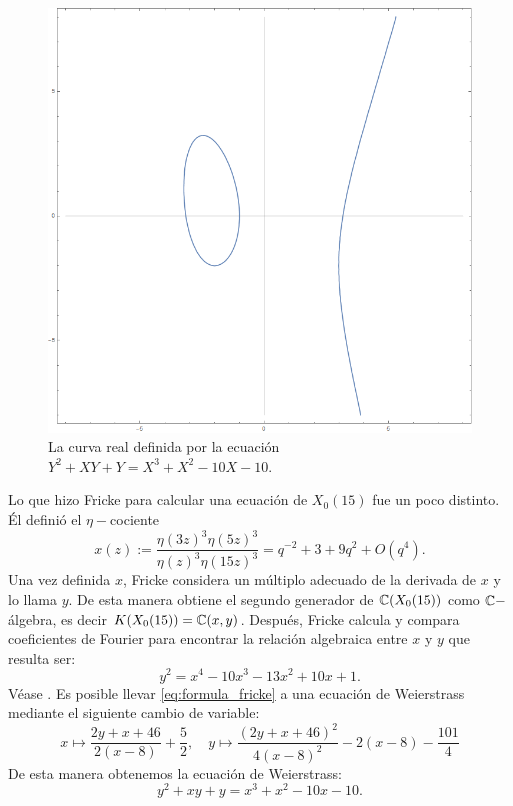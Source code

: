 \begin{figure}[!h]%
  \centering
  \includegraphics[scale=0.3]{figuras/eq_weierstrass}
  \caption{La curva real definida por la ecuación $Y^2+XY+Y=X^3+X^2-10X-10$.}
  \label{fig:eq_weierstrass}
\end{figure}%

\begin{nota}
Lo que hizo Fricke para calcular una ecuación de $X_0(15)$ fue un poco distinto. Él definió el $\eta-$cociente
\begin{equation}\label{eq:def_x_fricke}
	x(z):=
	\frac{\eta(3z)^3\eta(5z)^3}{\eta(z)^3\eta(15z)^3}=
	q^{-2}+3+9q^2+O(q^4).
\end{equation}
Una vez definida $x$, Fricke considera un múltiplo adecuado de la derivada de $x$ y lo llama $y$. De esta manera obtiene el segundo generador de $\mathbb{C}(X_0(15))$ como $\mathbb{C}-$álgebra, es decir $K(X_0(15))=\mathbb{C}(x,y)$. Después, Fricke calcula y compara coeficientes de Fourier para encontrar la relación algebraica entre $x$ y $y$ que resulta ser:
\begin{equation}\label{eq:formula_fricke}
		y^2=x^4-10x^3-13x^2+10x+1.
\end{equation}
Véase \cite[página 439]{Fricke}. Es posible llevar \eqref{eq:formula_fricke} a una ecuación de Weierstrass mediante el siguiente cambio de variable:
	\[
		x\mapsto \frac{2y+x+46}{2(x-8)}+\frac{5}{2},\quad
		y\mapsto \frac{(2y+x+46)^2}{4(x-8)^2}-2(x-8)-\frac{101}{4}
	\]
De esta manera obtenemos la ecuación de Weierstrass:
	\begin{equation}\label{eq:relacionweierstrass}
		y^2+xy+y=x^3+x^2-10x-10.
	\end{equation}
\end{nota}

